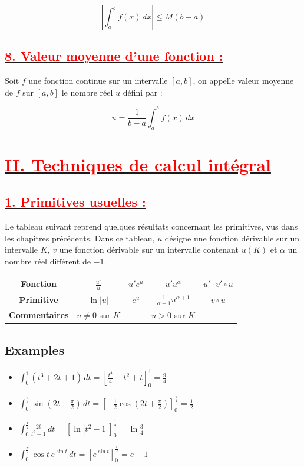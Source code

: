 \documentclass[12pt,a4paper]{article}
\begin{document}
\[
\left| \int_a^b f(x) \, dx \right| \leq M (b-a)
\]

\subsection*{\underline{\textbf{\textcolor{red}{8. Valeur moyenne d'une fonction :}}}}

Soit \( f \) une fonction continue sur un intervalle \( [a, b] \), on appelle valeur moyenne de \( f \) sur \( [a, b] \) le nombre réel \( u \) défini par :

\[
u = \frac{1}{b - a} \int_a^b f(x) \, dx
\]
\section*{\underline{\textbf{\textcolor{red}{II. Techniques de calcul intégral}}}}

\subsection*{\underline{\textbf{\textcolor{red}{1. Primitives usuelles :}}}}

Le tableau suivant reprend quelques résultats concernant les primitives, vus dans les chapitres précédents. Dans ce tableau, \( u \) désigne une fonction dérivable sur un intervalle \( K \), \( v \) une fonction dérivable sur un intervalle contenant \( u(K) \) et \( \alpha \) un nombre réel différent de \( -1 \).

\begin{tabular}{|c|c|c|c|c|}
\hline
\textbf{Fonction} & \( \frac{u'}{u} \) & \( u' e^u \) & \( u' u^\alpha \) & \( u' \cdot v' \circ u \) \\
\hline
\textbf{Primitive} & \( \ln |u| \) & \( e^u \) & \( \frac{1}{\alpha + 1} u^{\alpha + 1} \) & \( v \circ u \) \\
\hline
\textbf{Commentaires} & \( u \neq 0 \) sur \( K \) & - & \( u > 0 \) sur \( K \) & - \\
\hline
\end{tabular}

\subsection*{Examples}

\begin{itemize}
    \item \( \int_0^1 \left( t^3 + 2t + 1 \right) \, dt = \left[ \frac{t^4}{4} + t^2 + t \right]_0^1 = \frac{9}{4} \)
    
    \item \( \int_0^{\frac{\pi}{4}} \sin \left( 2t + \frac{\pi}{2} \right) \, dt = \left[ -\frac{1}{2} \cos \left( 2t + \frac{\pi}{2} \right) \right]_0^{\frac{\pi}{4}} = \frac{1}{2} \)
    
    \item \( \int_0^{\frac{1}{2}} \frac{2t}{t^2 - 1} \, dt = \left[ \ln |t^2 - 1| \right]_0^{\frac{1}{2}} = \ln \frac{3}{4} \)
    
    \item \( \int_0^{\frac{\pi}{2}} \cos t \, e^{\sin t} \, dt = \left[ e^{\sin t} \right]_0^{\frac{\pi}{2}} = e - 1 \)
\end{itemize}
\end{document}
